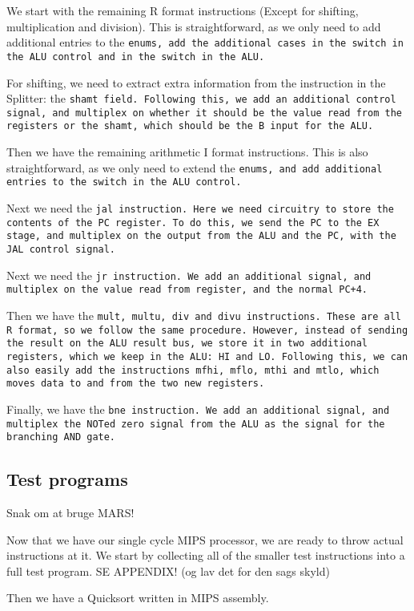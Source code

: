 We start with the remaining R format instructions (Except for shifting, multiplication and division). This is straightforward, as we only need to add additional entries to the \tt{enum}s, add the additional cases in the \tt{switch} in the ALU control and in the \tt{switch} in the ALU.

For shifting, we need to extract extra information from the instruction in the Splitter: the \tt{shamt} field. Following this, we add an additional control signal, and multiplex on whether it should be the value read from the registers or the \tt{shamt}, which should be the B input for the ALU.

Then we have the remaining arithmetic I format instructions. This is also straightforward, as we only need to extend the \tt{enum}s, and add additional entries to the \tt{switch} in the ALU control.

Next we need the \tt{jal} instruction. Here we need circuitry to store the contents of the \tt{PC} register. To do this, we send the \tt{PC} to the \tt{EX} stage, and multiplex on the output from the ALU and the \tt{PC}, with the \tt{JAL} control signal.

Next we need the \tt{jr} instruction. We add an additional signal, and multiplex on the value read from register, and the normal \tt{PC+4}.

Then we have the \tt{mult}, \tt{multu}, \tt{div} and \tt{divu} instructions. These are all R format, so we follow the same procedure. However, instead of sending the result on the ALU result bus, we store it in two additional registers, which we keep in the ALU: \tt{HI} and \tt{LO}. Following this, we can also easily add the instructions \tt{mfhi}, \tt{mflo}, \tt{mthi} and \tt{mtlo}, which moves data to and from the two new registers.

Finally, we have the \tt{bne} instruction. We add an additional signal, and multiplex the \tt{NOT}ed \tt{zero} signal from the ALU as the signal for the branching \tt{AND} gate.

\subsection{Test programs}
Snak om at bruge MARS!

Now that we have our single cycle MIPS processor, we are ready to throw actual instructions at it. We start by collecting all of the smaller test instructions into a full test program. SE APPENDIX! (og lav det for den sags skyld)

Then we have a Quicksort written in MIPS assembly.